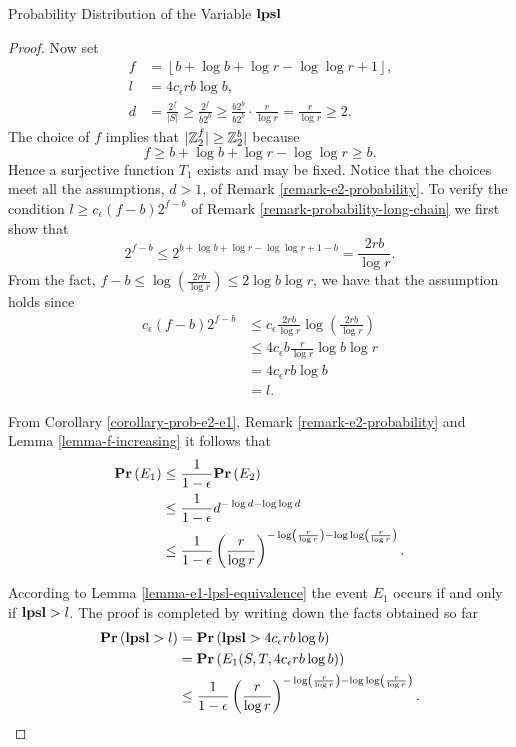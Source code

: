 \begin{section}{Probability Distribution of the Variable \texorpdfstring{$\mathbf{lpsl}$}{lpsl}}
\begin{proof}
Now set 
\[
\begin{split}
	f & = \left\lfloor b + \log b + \log r - \log \log r + 1 \right\rfloor \text{,} \\
	l & = 4c_{\epsilon}r b \log b \text{,} \\
	d & = \frac{2 ^ f}{|S|} \geq \frac{2 ^ f}{b 2 ^ b} \geq \frac{b 2 ^ b}{b 2 ^ b} \cdot \frac{r}{\log r} = \frac{r}{\log r} \geq 2 \text{.}
\end{split}
\]
The choice of $f$ implies that $|\mathbb{Z}_{2}^{f}| \geq \mathbb{Z}_{2}^{b}|$ because 
\[ 
f \geq b + \log b + \log r - \log \log r \geq b \text{.}
\]
Hence a surjective function $T_1$ exists and may be fixed. Notice that the choices meet all the assumptions, $d > 1$, of Remark \ref{remark-e2-probability}. To verify the condition $l \geq c_\epsilon (f - b) 2 ^ {f - b}$ of Remark \ref{remark-probability-long-chain} we first show that
\[
	2 ^ {f - b} \leq 2 ^ {b + \log b + \log r - \log \log r + 1 - b} = \frac{2 r b}{\log r} \text{.}
\]
From the fact, $f - b \leq \log \left(\frac{2 r b}{\log r}\right) \leq 2 \log b \log r$, we have that the assumption holds since
\[
\begin{split}
c_{\epsilon}(f - b) 2 ^ {f - b}
	& \leq c_{\epsilon} \frac{2 r b}{\log r} \log \left(\frac{2 r b}{\log r}\right) \\
	& \leq 4 c_{\epsilon} b \frac{r}{\log r} \log b \log r \\
	& = 4 c_{\epsilon} r b \log b \\
	& = l \text{.}
\end{split}
\]

From Corollary \ref{corollary-prob-e2-e1}, Remark \ref{remark-e2-probability} and Lemma \ref{lemma-f-increasing} it follows that
\[
\begin{split}
\mathbf{Pr}\left(E_1\right)
	& \leq \frac{1}{1 - \epsilon} \mathbf{Pr}\left(E_2\right) \\
	& \leq \frac{1}{1 - \epsilon} d ^ {-\log d - \log \log d} \\ 
	& \leq \frac{1}{1 - \epsilon} \left(\frac{r}{\log r}\right)^{-\log \left(\frac{r}{\log r}\right) - \log \log \left(\frac{r}{\log r}\right)} \text{.}
\end{split}
\]

According to Lemma \ref{lemma-e1-lpsl-equivalence} the event $E_1$ occurs if and only if $\mathbf{lpsl} > l$. The proof is completed by writing down the facts obtained so far
\[
\begin{split}
\mathbf{Pr}\left(\mathbf{lpsl} > l\right) 
	& = \mathbf{Pr}\left(\mathbf{lpsl} > 4c_{\epsilon} r b \log b\right) \\
	& = \mathbf{Pr}\left(E_1(S, T, 4c_{\epsilon} r b \log b)\right) \\
	& \leq \frac{1}{1 - \epsilon} \left(\frac{r}{\log r}\right)^{-\log \left(\frac{r}{\log r}\right) - \log \log \left(\frac{r}{\log r}\right)} \text{.}
\end{split}
\]
\end{proof}


\end{section}
